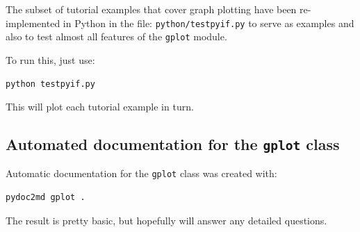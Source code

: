 \documentclass[a4paper,twoside,11pt]{article}
\newcommand{\newpara}{\par\vspace{4mm}\noindent}
\begin{document}
\newpara
The subset of tutorial examples that cover graph plotting have been re-implemented in Python
in the file: \texttt{python/testpyif.py} to serve as examples and also to test almost all features
of the \texttt{gplot} module.

\newpara
To run this, just use:
\begin{lstlisting}
python testpyif.py
\end{lstlisting}
This will plot each tutorial example in turn.

\subsection{Automated documentation for the \texttt{gplot} class}

\newpara
Automatic documentation for the \texttt{gplot} class was created with:
\begin{lstlisting}
pydoc2md gplot . 
\end{lstlisting}
The result is pretty basic, but hopefully will answer any detailed questions.
\end{document}
